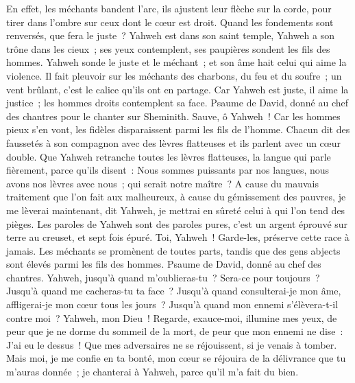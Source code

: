\begin{multicols}{2}
En effet, les méchants bandent l'arc, ils ajustent leur flèche sur la corde, pour tirer dans l'ombre sur ceux dont le cœur est droit.
Quand les fondements sont renversés, que fera le juste~?
Yahweh est dans son saint temple, Yahweh a son trône dans les cieux~; ses yeux contemplent, ses paupières sondent les fils des hommes.
Yahweh sonde le juste et le méchant~; et son âme hait celui qui aime la violence.
Il fait pleuvoir sur les méchants des charbons, du feu et du soufre~; un vent brûlant, c'est le calice qu'ils ont en partage.
Car Yahweh est juste, il aime la justice~; les hommes droits contemplent sa face.
\VerseOne{}Psaume de David, donné au chef des chantres pour le chanter sur Sheminith.
Sauve, ô Yahweh~! Car les hommes pieux s'en vont, les fidèles disparaissent parmi les fils de l'homme.
Chacun dit des faussetés à son compagnon avec des lèvres flatteuses et ils parlent avec un cœur double.
Que Yahweh retranche toutes les lèvres flatteuses, la langue qui parle fièrement,
parce qu'ils disent~: Nous sommes puissants par nos langues, nous avons nos lèvres avec nous~; qui serait notre maître~?
A cause du mauvais traitement que l'on fait aux malheureux, à cause du gémissement des pauvres, je me lèverai maintenant, dit Yahweh, je mettrai en sûreté celui à qui l'on tend des pièges.
Les paroles de Yahweh sont des paroles pures, c'est un argent éprouvé sur terre au creuset, et sept fois épuré.
Toi, Yahweh~! Garde-les, préserve cette race à jamais.
Les méchants se promènent de toutes parts, tandis que des gens abjects sont élevés parmi les fils des hommes.
\VerseOne{}Psaume de David, donné au chef des chantres.
Yahweh, jusqu'à quand m'oublieras-tu~? Sera-ce pour toujours~? Jusqu'à quand me cacheras-tu ta face~?
Jusqu'à quand consulterai-je mon âme, affligerai-je mon cœur tous les jours~? Jusqu'à quand mon ennemi s'élèvera-t-il contre moi~?
Yahweh, mon Dieu~! Regarde, exauce-moi, illumine mes yeux, de peur que je ne dorme du sommeil de la mort,
de peur que mon ennemi ne dise~: J'ai eu le dessus~! Que mes adversaires ne se réjouissent, si je venais à tomber.
Mais moi, je me confie en ta bonté, mon cœur se réjouira de la délivrance que tu m'auras donnée~; je chanterai à Yahweh, parce qu'il m'a fait du bien.

\end{multicols}
